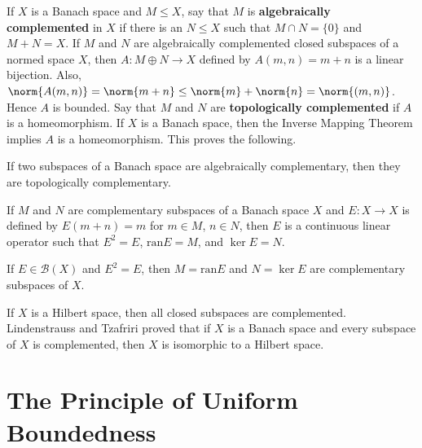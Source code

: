 If $X$ is a Banach space and $M\leq X$, say that $M$ is \textbf{algebraically complemented} in $X$ if there is an $N \leq X$ such that $M\cap N = \{0\}$ and $M+N = X$. If $M$ and $N$ are algebraically complemented closed subspaces of a normed space $X$, then $A:M\oplus N\rightarrow X$ defined by $A(m,n) = m+n$ is a linear bijection. Also, $\norm{A(m,n)} = \norm{m+n}\leq \norm{m}+\norm{n} = \norm{(m,n)}$. Hence $A$ is bounded. Say that $M$ and $N$ are \textbf{topologically complemented} if $A$ is a homeomorphism. If $X$ is a Banach space, then the Inverse Mapping Theorem implies $A$ is a homeomorphism. This proves the following.

\begin{thm}
    If two subspaces of a Banach space are algebraically complementary, then they are topologically complementary.
\end{thm}

\begin{thm}
    If $M$ and $N$ are complementary subspaces of a Banach space $X$ and $E:X\rightarrow X$ is defined by $E(m+n) = m$ for $m \in M$, $n \in N$, then $E$ is a continuous linear operator such that $E^2 = E$, $\text{ran}E = M$, and $\ker E = N$.

    If $E \in \mathscr{B}(X)$ and $E^2=E$, then $M =\text{ran}E$ and $N = \ker E$ are complementary subspaces of $X$.
\end{thm}

If $X$ is a Hilbert space, then all closed subspaces are complemented. Lindenstrauss and Tzafriri proved that if $X$ is a Banach space and every subspace of $X$ is complemented, then $X$ is isomorphic to a Hilbert space.


\section{The Principle of Uniform Boundedness}
\label{sec:unifBound}


